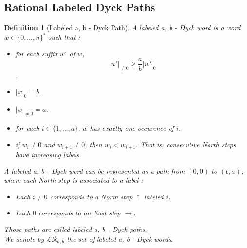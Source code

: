 \documentclass[12pt]{report}
\newtheorem{definition}{Definition}
\begin{document}
\subsection{Rational Labeled Dyck Paths}

\begin{definition}[Labeled a, b - Dyck Path]
    A \emph{labeled a, b - Dyck word} is a word $w \in 
    \{0, \ldots, n\}^*$ such that :
    \begin{itemize}
        \item for each suffix $w'$ of $w$,
            $$|w'|_{\neq 0} \geqslant \frac{a}{b}|w'|_0$$.
        \item $|w|_0 = b$.
        \item $|w|_{\neq 0} = a$.
        \item for each $i \in \{1, \ldots, a\}$, $w$ has 
            exactly one occurence of $i$.
        \item if $w_i \neq 0$ and $w_{i+1} \neq 0$,
            then $w_i < w_{i+1}$. That is, consecutive
            North steps have increasing labels.
    \end{itemize}
    A labeled a, b - Dyck word can be represented
    as a path from $(0,0)$ to $(b,a)$, where each North
    step is associated to a label :
    \begin{itemize}
        \item Each $i \neq 0$ corresponds to a
            \emph{North step} $\uparrow$ labeled $i$.
        \item Each $0$ corresponds to an
            \emph{East step} $\rightarrow$.
    \end{itemize}
    Those paths are called \emph{labeled a, b - Dyck paths}.\\
    We denote by $\mathcal{LR}_{a,b}$ the set of labeled
    a, b - Dyck words.
\end{definition}
\end{document}
